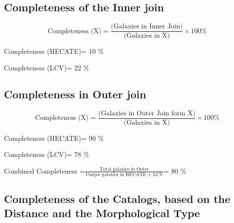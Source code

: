 \documentclass[
]{article}
\begin{document}
\subsection{Completeness of the Inner
join}\label{completeness-of-the-inner-join}

\[
\text{Completeness (X)}=\frac{\text{(Galaxies in Inner Join)}}{\text{(Galaxies in X)}}×100\%
\]

Completeness (HECATE)= 10 \%

Completeness (LCV)= 22 \%

\subsection{Completeness in Outer
join}\label{completeness-in-outer-join}

\[
\text{Completeness (X)}=\frac{\text{(Galaxies in Outer Join form X)}}{\text{(Galaxies in X)}}×100\%
\]

Completeness (HECATE)= 90 \%

Completeness (LCV)= 78 \%

Combined Completeness
=\(\frac{\text{Total galaxies in Outer}}{\text{Unique galaxies in HECATE + LCV}}\)=
80 \%

\subsection{Completeness of the Catalogs, based on the Distance and the
Morphological
Type}\label{completeness-of-the-catalogs-based-on-the-distance-and-the-morphological-type}
\end{document}

